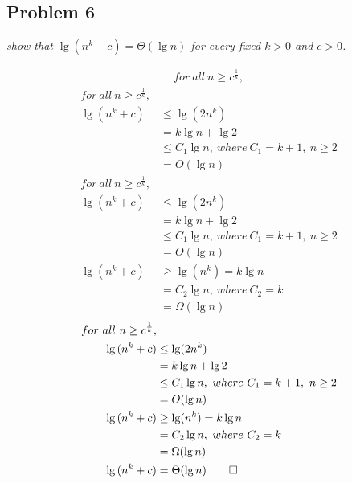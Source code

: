 \documentclass[handout]{beamer}
\begin{document}
        
        
    \subsection{Problem 6}
    
        \begin{frame}[c,shrink]{\subsecname}
            \textit{show that $\lg(n^k+c) = \Theta(\lg{n})$ for every fixed $k>0$ and $c>0$.}
            \begin{overprint}
            \begin{align*}
                for\ all\ n \geq c^{\frac{1}{k}},
            \end{align*}
            \begin{align*}
                for\ all\ n \geq c^{\frac{1}{k}},&\\
                \lg{(n^k+c)} &\leq \lg(2n^k)\\
                		  &=    k\lg{n}+\lg{2}\\
                		  &\leq C_1\lg{n},\ where\ C_1= k+1,\ n\geq 2\\
                		  &=    O(\lg{n})
            \end{align*}
            \begin{align*}
                for\ all\ n \geq c^{\frac{1}{k}},&\\
                \lg{(n^k+c)} &\leq \lg(2n^k)\\
                		  &=    k\lg{n}+\lg{2}\\
                		  &\leq C_1\lg{n},\ where\ C_1= k+1,\ n\geq 2\\
                		  &=    O(\lg{n})\\
                \lg{(n^k+c)} &\geq \lg(n^k) = k\lg{n}\\
                		  &= C_2\lg{n},\ where\ C_2= k\\
                		  &= \Omega(\lg{n})
            \end{align*}
            \begin{align*}
                for\ all\ n \geq c^{\frac{1}{k}},&\\
                \lg{(n^k+c)} &\leq \lg(2n^k)\\
                		  &=    k\lg{n}+\lg{2}\\
                		  &\leq C_1\lg{n},\ where\ C_1= k+1,\ n\geq 2\\
                		  &=    O(\lg{n})\\
                \lg{(n^k+c)} &\geq \lg(n^k) = k\lg{n}\\
                		  &= C_2\lg{n},\ where\ C_2= k\\
                		  &= \Omega(\lg{n})\\
                \lg{(n^k+c)} &= \Theta(\lg{n}) \qed
            \end{align*}
            \end{overprint}
        \end{frame}
        
\end{document}
